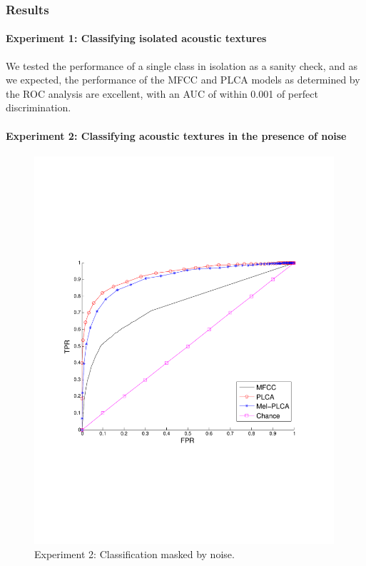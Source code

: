\documentclass[a4paper,10pt,final]{ThesisStyle}
\begin{document}
\subsubsection{Results}

\paragraph{Experiment 1: Classifying isolated acoustic textures}

We tested the performance of a single class in isolation as a sanity check, and as we expected, the performance of the MFCC and PLCA models as determined by the ROC analysis are excellent, with an AUC of within 0.001 of perfect discrimination.




\paragraph{Experiment 2: Classifying acoustic textures in the presence of noise}

\begin{figure}
\centering
\includegraphics[width=0.99\textwidth]{images/unknown-mixture-roc-results.pdf}
\caption{Experiment 2: Classification masked by noise.}
\label{fig:unknown-mixture-roc-results}
\end{figure}
\end{document}
